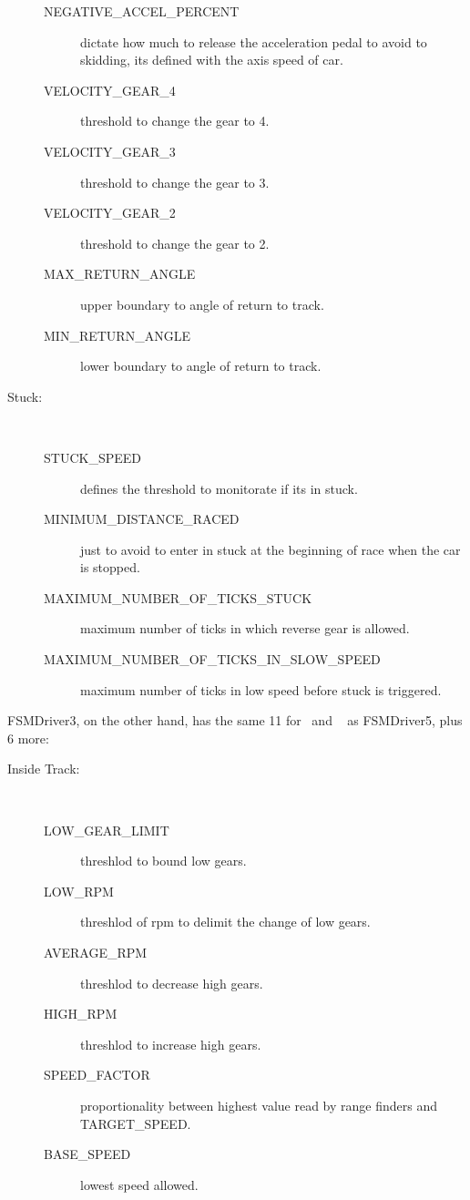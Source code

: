 \begin{description}
\begin{description}
		\item[NEGATIVE\_ACCEL\_PERCENT] dictate how much to release the acceleration pedal to avoid to skidding, its defined with the axis speed of car.
		\item[VELOCITY\_GEAR\_4] threshold to change the gear to 4.
		\item[VELOCITY\_GEAR\_3] threshold to change the gear to 3.
		\item[VELOCITY\_GEAR\_2] threshold to change the gear to 2.
		\item[MAX\_RETURN\_ANGLE] upper boundary to angle of return to track.
		\item[MIN\_RETURN\_ANGLE] lower boundary to angle of return to track.
	\end{description}
	\item[Stuck:] \ %
	\begin{description}
		\item[STUCK\_SPEED] defines the threshold to monitorate if its in stuck.
		\item[MINIMUM\_DISTANCE\_RACED] just to avoid to enter in stuck at the beginning of race when the car is stopped.
		\item[MAXIMUM\_NUMBER\_OF\_TICKS\_STUCK] maximum number of ticks in which reverse gear is allowed.
		\item[MAXIMUM\_NUMBER\_OF\_TICKS\_IN\_SLOW\_SPEED] maximum number of ticks in low speed before stuck is triggered.
	\end{description}
\end{description}

FSMDriver3, on the other hand, has the same 11 for \OT~and \St~ as FSMDriver5, plus 6 more:

\begin{description}
	\item[Inside Track:] \ %
	\begin{description}
		\item[LOW\_GEAR\_LIMIT] threshlod to bound low gears.
		\item[LOW\_RPM] threshlod of rpm to delimit the change of low gears.
		\item[AVERAGE\_RPM] threshlod to decrease high gears.
		\item[HIGH\_RPM] threshlod to increase high gears.
		\item[SPEED\_FACTOR] proportionality between highest value read by range finders and TARGET\_SPEED.
		\item[BASE\_SPEED] lowest speed allowed.
	\end{description}
\end{description}

